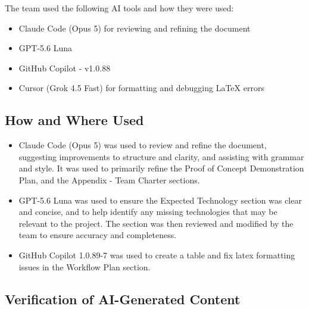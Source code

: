\documentclass{article}
\begin{document}
The team used the following AI tools and how they were used:
\begin{itemize}
  \item Claude Code (Opus 5) for reviewing and refining the document
  \item GPT-5.6 Luna
  \item GitHub Copilot - v1.0.88
  \item Cursor (Grok 4.5 Fast) for formatting and debugging LaTeX errors
\end{itemize}

\subsection{How and Where Used}




\begin{itemize}
\item Claude Code (Opus 5) was used to review and refine the document,
suggesting improvements to structure and clarity, and assisting with grammar and
style. It was used to primarily refine the Proof of Concept Demonstration Plan,
and the Appendix - Team Charter sections.
\end{itemize}

\begin{itemize}
    \item GPT-5.6 Luna was used to ensure the Expected Technology section was clear and concise, and to help identify any missing technologies that may be relevant to the project. The section was then reviewed and modified by the team to ensure accuracy and completeness.
    \item GitHub Copilot 1.0.89-7 was used to create a table and fix latex formatting issues in the Workflow Plan section.
\end{itemize}


\subsection{Verification of AI-Generated Content}
\end{document}
